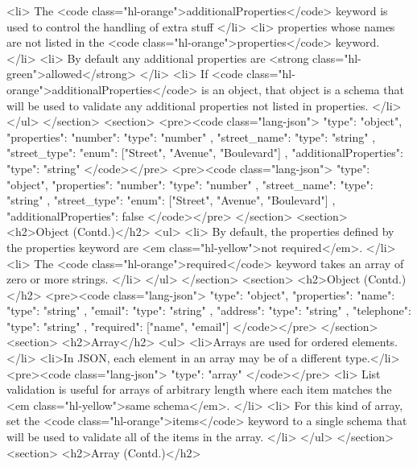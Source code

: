 \documentclass{efd-lecture}
\begin{document}
      <li>
        The <code class="hl-orange">additionalProperties</code> keyword is used
        to control the handling of extra stuff
      </li>
      <li>
        properties whose names are not listed in the
        <code class="hl-orange">properties</code> keyword.
      </li>
      <li>
        By default any additional properties are
        <strong class="hl-green">allowed</strong>
      </li>
      <li>
        If <code class="hl-orange">additionalProperties</code> is an object,
        that object is a schema that will be used to validate any additional
        properties not listed in properties.
      </li>
    </ul>
  </section>
  <section>
    <pre><code class="lang-json">
{
  "type": "object",
  "properties": {
    "number": { "type": "number" },
    "street_name": { "type": "string" },
    "street_type": { "enum": ["Street", "Avenue", "Boulevard"] }
  },
  "additionalProperties": { "type": "string" }
}
    </code></pre>
    <pre><code class="lang-json">
{
  "type": "object",
  "properties": {
    "number": { "type": "number" },
    "street_name": { "type": "string" },
    "street_type": { "enum": ["Street", "Avenue", "Boulevard"] }
  },
  "additionalProperties": false
}
    </code></pre>
  </section>
  <section>
    <h2>Object (Contd.)</h2>
    <ul>
      <li>
        By default, the properties defined by the properties keyword are
        <em class="hl-yellow">not required</em>.
      </li>
      <li>
        The <code class="hl-orange">required</code> keyword takes an array of
        zero or more strings.
      </li>
    </ul>
  </section>
  <section>
    <h2>Object (Contd.)</h2>
    <pre><code class="lang-json">
{
  "type": "object",
  "properties": {
    "name":      { "type": "string" },
    "email":     { "type": "string" },
    "address":   { "type": "string" },
    "telephone": { "type": "string" }
  },
  "required": ["name", "email"]
}
    </code></pre>
  </section>
  <section>
    <h2>Array</h2>
    <ul>
      <li>Arrays are used for ordered elements.</li>
      <li>In JSON, each element in an array may be of a different type.</li>
      <pre><code class="lang-json">
{ "type": "array" }
      </code></pre>
      <li>
        List validation is useful for arrays of arbitrary length where each item
        matches the <em class="hl-yellow">same schema</em>.
      </li>
      <li>
        For this kind of array, set the
        <code class="hl-orange">items</code> keyword to a single schema that
        will be used to validate all of the items in the array.
      </li>
    </ul>
  </section>
  <section>
    <h2>Array (Contd.)</h2>
\end{document}
